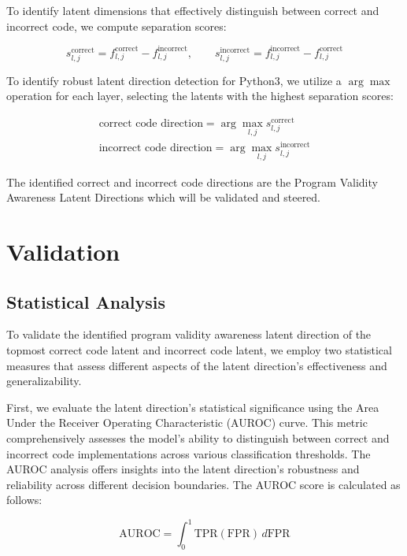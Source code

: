 To identify latent dimensions that effectively distinguish between correct and incorrect code, we compute separation scores:

\begin{equation}
    s_{l,j}^{\text{correct}} = f_{l,j}^{\text{correct}} - f_{l,j}^{\text{incorrect}}, \qquad
    s_{l,j}^{\text{incorrect}} = f_{l,j}^{\text{incorrect}} - f_{l,j}^{\text{correct}}
\end{equation}


To identify robust latent direction detection for Python3, we utilize a $\arg\max$ operation for each layer, selecting the latents with the highest separation scores:

\begin{align}
\text{correct code direction} = \arg\max_{l,j} s_{l,j}^{\text{correct}} \\
\text{incorrect code direction} = \arg\max_{l,j} s_{l,j}^{\text{incorrect}}
\end{align}

The identified correct and incorrect code directions are the Program Validity Awareness Latent Directions which will be validated and steered.

\section{Validation}
\subsection{Statistical Analysis}
To validate the identified program validity awareness latent direction of the topmost correct code latent and incorrect code latent, we employ two statistical measures that assess different aspects of the latent direction's effectiveness and generalizability. 

First, we evaluate the latent direction's statistical significance using the Area Under the Receiver Operating Characteristic (AUROC) curve. This metric comprehensively assesses the model's ability to distinguish between correct and incorrect code implementations across various classification thresholds. The AUROC analysis offers insights into the latent direction's robustness and reliability across different decision boundaries. The AUROC score is calculated as follows:

\begin{equation} 
\text{AUROC} = \int_0^1 \text{TPR}(\text{FPR})\,d\text{FPR}
\end{equation}

